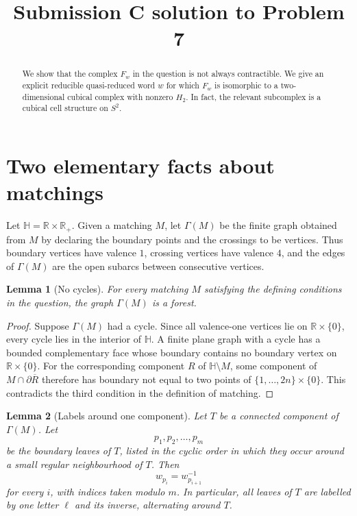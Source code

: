 \documentclass[11pt]{article}
\newtheorem{lemma}{Lemma}
\newcommand{\HH}{\mathbb H}
\newcommand{\bd}{\partial}
\begin{document}
\title{Submission C solution to Problem 7}
\date{}
\maketitle

\begin{abstract}
We show that the complex \(F_w\) in the question is not always contractible.  We give an explicit reducible quasi-reduced word \(w\) for which \(F_w\) is isomorphic to a two-dimensional cubical complex with nonzero \(H_2\).  In fact, the relevant subcomplex is a cubical cell structure on \(S^2\).
\end{abstract}

\section{Two elementary facts about matchings}

Let \(\HH=\mathbb R\times \mathbb R_+\).  Given a matching \(M\), let \(\Gamma(M)\) be the finite graph obtained from \(M\) by declaring the boundary points and the crossings to be vertices.  Thus boundary vertices have valence \(1\), crossing vertices have valence \(4\), and the edges of \(\Gamma(M)\) are the open subarcs between consecutive vertices.

\begin{lemma}[No cycles]\label{lem:forest}
For every matching \(M\) satisfying the defining conditions in the question, the graph \(\Gamma(M)\) is a forest.
\end{lemma}

\begin{proof}
Suppose \(\Gamma(M)\) had a cycle.  Since all valence-one vertices lie on \(\mathbb R\times\{0\}\), every cycle lies in the interior of \(\HH\).  A finite plane graph with a cycle has a bounded complementary face whose boundary contains no boundary vertex on \(\mathbb R\times\{0\}\).  For the corresponding component \(R\) of \(\HH\setminus M\), some component of \(M\cap \bd \overline R\) therefore has boundary not equal to two points of \(\{1,\dots,2n\}\times\{0\}\).  This contradicts the third condition in the definition of matching.
\end{proof}

\begin{lemma}[Labels around one component]\label{lem:cycliclabels}
Let \(T\) be a connected component of \(\Gamma(M)\).  Let
\[
p_1,p_2,\dots,p_m
\]
be the boundary leaves of \(T\), listed in the cyclic order in which they occur around a small regular neighbourhood of \(T\).  Then
\[
w_{p_i}=w_{p_{i+1}}^{-1}
\]
for every \(i\), with indices taken modulo \(m\).  In particular, all leaves of \(T\) are labelled by one letter \(\ell\) and its inverse, alternating around \(T\).
\end{lemma}
\end{document}
